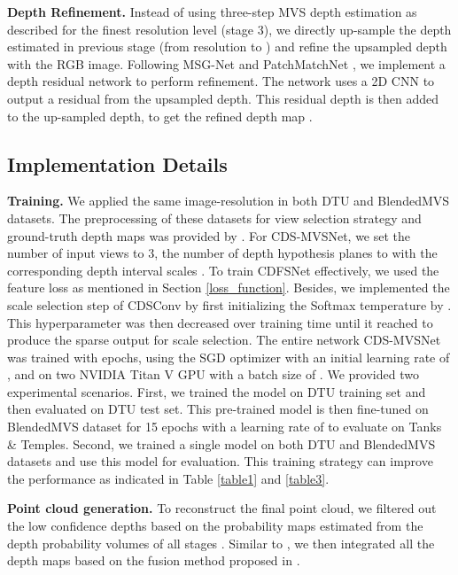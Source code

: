 \documentclass{article} \usepackage{iclr2022_conference,times}
\begin{document}
\textbf{Depth Refinement.} Instead of using three-step MVS depth estimation as described for the finest resolution level (stage 3), we directly up-sample the depth estimated in previous stage (from resolution  to ) and refine the upsampled depth with the RGB image. Following MSG-Net \citep{hui2016depth} and PatchMatchNet \citep{wang2021patchmatchnet}, we implement a depth residual network to perform refinement. The network uses a 2D CNN to output a residual from the upsampled depth. This residual depth is then added to the up-sampled depth, to get the refined depth map .
\subsection{Implementation Details}
\textbf{Training.} We applied the same image-resolution  in both DTU and BlendedMVS datasets. The preprocessing of these datasets for view selection strategy and ground-truth depth maps was provided by \cite{yao2018mvsnet}. For CDS-MVSNet, we set the number of input views to 3, the number of depth hypothesis planes to  with the corresponding depth interval scales . To train CDFSNet effectively, we used the feature loss as mentioned in Section \ref{loss_function}. Besides, we implemented the scale selection step of CDSConv by first initializing the Softmax temperature by . This hyperparameter was then decreased over training time until it reached  to produce the sparse output for scale selection. The entire network CDS-MVSNet was trained with  epochs, using the SGD optimizer with an initial learning rate of , and on two NVIDIA Titan V GPU with a batch size of . We provided two experimental scenarios. First, we trained the model on DTU training set and then evaluated on DTU test set. This pre-trained model is then fine-tuned on BlendedMVS dataset for 15 epochs with a learning rate of  to evaluate on Tanks \& Temples. Second, we trained a single model on both DTU and BlendedMVS datasets and use this model for evaluation. This training strategy can improve the performance as indicated in Table \ref{table1} and \ref{table3}. 

\textbf{Point cloud generation.} To reconstruct the final point cloud, we filtered out the low confidence depths based on the probability maps estimated from the depth probability volumes of all stages \citep{zhang2020visibility}. Similar to \citep{gu2020cascade,zhang2020visibility}, we then integrated all the depth maps based on the fusion method proposed in \citep{galliani2015massively,yao2018mvsnet}. 
\end{document}
